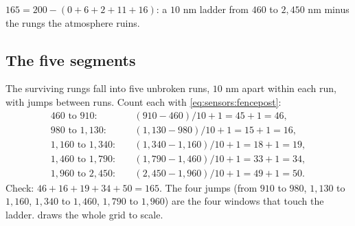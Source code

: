 \begin{keypoint}
$165 = 200 - (0 + 6 + 2 + 11 + 16)$: a $10$ nm ladder from $460$ to $2{,}450$ nm minus the rungs
the atmosphere ruins.
\end{keypoint}

\subsection{The five segments}

The surviving rungs fall into five unbroken runs, $10$ nm apart within each run, with jumps
between runs. Count each with \cref{eq:sensors:fencepost}:
\begin{align*}
460 \text{ to } 910:&\quad (910 - 460)/10 + 1 = 45 + 1 = 46,\\
980 \text{ to } 1{,}130:&\quad (1{,}130 - 980)/10 + 1 = 15 + 1 = 16,\\
1{,}160 \text{ to } 1{,}340:&\quad (1{,}340 - 1{,}160)/10 + 1 = 18 + 1 = 19,\\
1{,}460 \text{ to } 1{,}790:&\quad (1{,}790 - 1{,}460)/10 + 1 = 33 + 1 = 34,\\
1{,}960 \text{ to } 2{,}450:&\quad (2{,}450 - 1{,}960)/10 + 1 = 49 + 1 = 50.
\end{align*}
Check: $46 + 16 + 19 + 34 + 50 = 165$. The four jumps (from $910$ to $980$, $1{,}130$ to $1{,}160$,
$1{,}340$ to $1{,}460$, $1{,}790$ to $1{,}960$) are the four windows that touch the ladder.
 draws the whole grid to scale.

